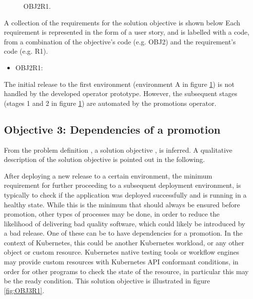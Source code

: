\begin{figure}[h]
	\centering
	\caption{OBJ2R1.
	}
	\label{fig:OBJ2R1}	
\end{figure}

A collection of the requirements for the solution objective is shown below
Each requirement is represented in the form of a user story,
and is labelled with a code, from a combination of the
objective's code (e.g. OBJ2) and the requirement's code (e.g. R1).

\begin{itemize}
	\item OBJ2R1: 
\end{itemize}

The initial release to the first environment (environment A in figure \ref{fig:OBJ2R1})
is not handled by the developed operator prototype.
However, the subsequent stages (stages 1 and 2 in figure \ref{fig:OBJ2R1})
are automated by the promotions operator.

\subsection{Objective 3: Dependencies of a promotion}
\label{objective3}

From the problem definition
,
a solution objective
,
is inferred.
A qualitative description of the solution objective
is pointed out in the following.

After deploying a new release to a certain environment,
the minimum requirement for further proceeding to a subsequent deployment environment,
is typically to check if the application was deployed successfully and is running in a healthy state.
While this is the minimum that should always be ensured before promotion,
other types of processes may be done, in order to reduce the likelihood of delivering bad quality software,
which could likely be introduced by a bad release.
One of these can be to have dependencies for a promotion.
In the context of Kubernetes, this could be another Kubernetes workload, or any other object or custom resource.
Kubernetes native testing tools or workflow engines may provide custom resources with Kubernetes API conformant
conditions, in order for other programs to check the state of the resource, in particular this may be the ready condition.
This solution objective is illustrated in figure \ref{fig:OBJ3R1}.

